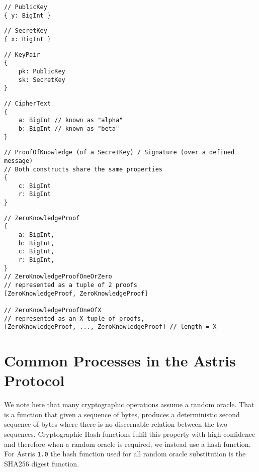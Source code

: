 \label{dt:elgamal:pk}
\begin{lstlisting}[style=ES6]
// PublicKey
{ y: BigInt }
\end{lstlisting}
\vspace*{-0.95em}
\label{dt:elgamal:sk}
\begin{lstlisting}[style=ES6, firstnumber=last]
// SecretKey
{ x: BigInt }
\end{lstlisting}
\newpage %
\label{dt:elgamal:keypair}
\begin{lstlisting}[style=ES6, firstnumber=last]
// KeyPair
{
    pk: PublicKey
    sk: SecretKey
}
\end{lstlisting}
\vspace*{-0.95em}
\label{dt:elgamal:ct}
\begin{lstlisting}[style=ES6, firstnumber=last]
// CipherText
{
    a: BigInt // known as "alpha"
    b: BigInt // known as "beta"
}
\end{lstlisting}
\vspace*{-0.95em}
\label{dt:elgamal:pok}
\begin{lstlisting}[style=ES6, firstnumber=last]
// ProofOfKnowledge (of a SecretKey) / Signature (over a defined message)
// Both constructs share the same properties
{
    c: BigInt
    r: BigInt
}
\end{lstlisting}
\vspace*{-0.95em}
\label{dt:elgamal:zkp}
\begin{lstlisting}[style=ES6, firstnumber=last]
// ZeroKnowledgeProof
{
    a: BigInt,
    b: BigInt,
    c: BigInt,
    r: BigInt,
}
// ZeroKnowledgeProofOneOrZero
// represented as a tuple of 2 proofs
[ZeroKnowledgeProof, ZeroKnowledgeProof]

// ZeroKnowledgeProofOneOfX
// represented as an X-tuple of proofs,
[ZeroKnowledgeProof, ..., ZeroKnowledgeProof] // length = X
\end{lstlisting}


\chapter{Common Processes in the Astris Protocol}
\label{appendix:processes}

We note here that many cryptographic operations assume a random oracle. That is a function that given a sequence of bytes, produces a deterministic second sequence of bytes where there is no discernable relation between the two sequences. Cryptographic Hash functions fulfil this property with high confidence and therefore when a random oracle is required, we instead use a hash function. For Astris \texttt{1.0} the hash function used for all random oracle substitution is the SHA256 digest function.


